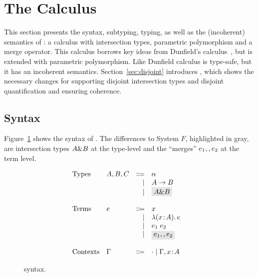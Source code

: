 \section{The \name Calculus}
\label{sec:fi}

This section presents the syntax, subtyping, typing, as well as the
(incoherent) semantics of \name: a calculus with intersection types,
parametric polymorphism and a merge
operator. This calculus borrows key ideas from Dunfield's
calculus~\cite{dunfield2014elaborating}, but is extended with parametric polymorphism. Like Dunfield calculus
\name is type-safe, but it has an incoherent semantics.
Section~\ref{sec:disjoint} introduces \name, which shows the necessary changes
for supporting disjoint intersection types and disjoint
quantification and ensuring coherence.

\subsection{Syntax}

Figure~\ref{fig:fi-syntax} shows the syntax of \name. The differences to
System $F$, highlighted in gray, are intersection types $A \& B$ at the
type-level and the ``merges'' $e_1 ,, e_2$ at the term level.

\begin{figure}
  \[
    \begin{array}{l}
      \begin{array}{llrll}
        \text{Types}
        & A, B, C & \Coloneqq & \alpha    & \\
        &      & \mid & A \to B        & \\
        &      & \mid & \highlight{$A \inter B$}  & \\

        \\
        \text{Terms}
        & e & \Coloneqq & x            & \\
        &   & \mid & \lamty x A e      & \\
        &   & \mid & \app {e_1} {e_2}  & \\
        &   & \mid & \highlight{$e_1 \mergeop e_2$}  & \\

        \\
        \text{Contexts}
        & \Gamma & \Coloneqq & \cdot
                   \mid \Gamma, x \oftype A  & \\
      \end{array}
    \end{array}
  \]

  \caption{\name syntax.}
  \label{fig:fi-syntax}
\end{figure}

